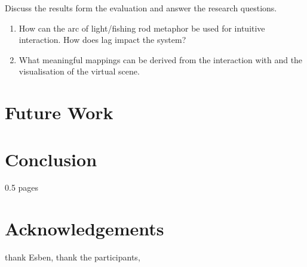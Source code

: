 \documentclass[10pt,a4paper]{scrartcl}
\begin{document}
Discuss the results form the evaluation and answer the research questions. 

\begin{enumerate}
\item How can the arc of light/fishing rod metaphor be used for intuitive interaction. How does lag impact the system?
\item What meaningful mappings can be derived from the interaction with and the visualisation of the virtual scene.
\end{enumerate}

\section{Future Work}

\section{Conclusion}
0.5 pages

\section{Acknowledgements}
thank Esben, thank the participants,






\end{document}
